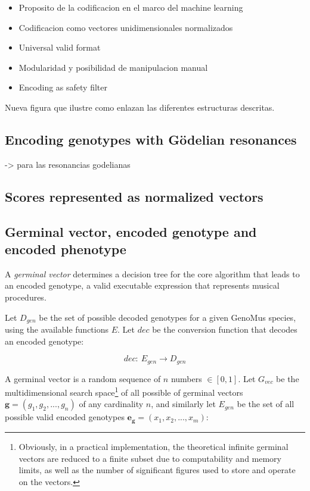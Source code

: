 \documentclass{article}
\renewcommand{\vec}[1]{\mathbf{#1}}
\begin{document}
{\color{gray}


\begin{itemize}
\item Proposito de la codificacion en el marco del machine learning
\item Codificacion como vectores unidimensionales normalizados
\item Universal valid format
\item Modularidad y posibilidad de manipulacion manual
\item Encoding as safety filter

\end{itemize}

}

Nueva figura que ilustre como enlazan las diferentes estructuras descritas.


\subsection{Encoding genotypes with G{\"o}delian resonances}

{\color{red}

\cite{deLemosAlmada2017} -> para las resonancias godelianas

}

\subsection{Scores represented as normalized vectors}

\subsection{Germinal vector, encoded genotype and encoded phenotype}

A \emph{germinal vector} determines a decision tree for the core algorithm that leads to an encoded genotype, a valid executable expression that represents musical procedures.

Let $D_{gen}$ be the set of possible decoded genotypes for a given GenoMus species, using the available functions $E$. Let $dec$ be the conversion function that decodes an encoded genotype:

$$dec:\ E_{gen}\to D_{gen}$$



A germinal vector is a random sequence of $n$ numbers $\in [0, 1]$.  Let $G_{vec}$ be the multidimensional search space\footnote{Obviously, in a practical implementation, the theoretical infinite germinal vectors are reduced to a finite subset due to computability and memory limits, as well as the number of significant figures used to store and operate on the vectors.} of all possible of germinal vectors  $\vec{g} = (g_1, g_2, ..., g_n)$ of any cardinality $n$, and similarly let $E_{gen}$ be the set of all possible valid encoded genotypes $\vec{e_g} = (x_1, x_2, ..., x_m)$:
\end{document}
